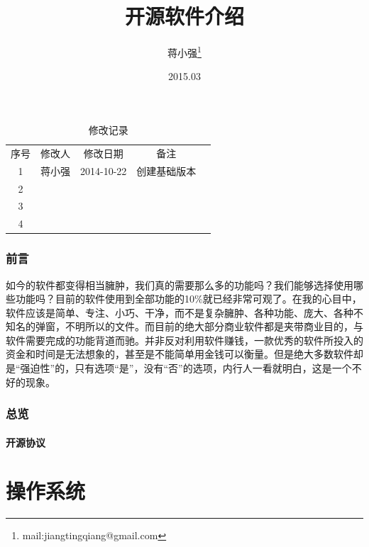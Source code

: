 \documentclass[paper=a4,fontsize=11pt]{article}
\begin{document}
	\title{开源软件介绍}		
	\author{蒋小强\footnote{mail:jiangtingqiang@gmail.com}}
	\date{2015.03}	
	
	\maketitle %
	\clearpage
	
	\begin{table}\caption{修改记录}					
		\medskip
		\centering		
		\begin{tabular}{|c|c|c|c|c|}
			\hline
			\multirow{1}{*}{序号}
			& \multicolumn{1}{|c|}{修改人}  
			& \multicolumn{1}{|c|}{修改日期} 
			& \multicolumn{1}{|c|}{备注}\\			
			\cline{1-4}
			1 & 蒋小强 & 2014-10-22 & 创建基础版本\\
			\hline
			2 & & &\\
			\hline
			3 & & &\\
			\hline
			4 & & &\\
			\hline
		\end{tabular}
	\end{table}
	\clearpage
	\section{前言}
	如今的软件都变得相当臃肿，我们真的需要那么多的功能吗？我们能够选择使用哪些功能吗？目前的软件使用到全部功能的10\%就已经非常可观了。在我的心目中，软件应该是简单、专注、小巧、干净，而不是复杂臃肿、各种功能、庞大、各种不知名的弹窗，不明所以的文件。而目前的绝大部分商业软件都是夹带商业目的，与软件需要完成的功能背道而驰。并非反对利用软件赚钱，一款优秀的软件所投入的资金和时间是无法想象的，甚至是不能简单用金钱可以衡量。但是绝大多数软件却是“强迫性”的，只有选项“是”，没有“否”的选项，内行人一看就明白，这是一个不好的现象。
	
	\newpage
	\section{总览}
	
	\subsection{开源协议}
	
	
	\clearpage
	
	\part{操作系统}
		
\end{document}
